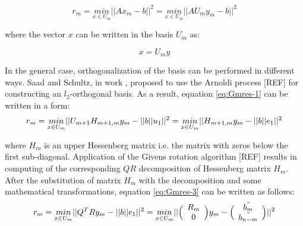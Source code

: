 \begin{equation} \label{eq:Gmres-1}
	r_{m} = \underset{x \in U_m}{min}||Ax_{m} - b||^2 =  \underset{x \in U_m}{min}||AU_m y_{m} - b||^2
\end{equation}

where the vector $x$ can be written in the basis $U_m$ as:

\begin{equation} \label{eq:Gmres-2}
		x = U_{m} y
\end{equation}

In the general case, orthogonalization of the basis can be performed in different ways. Saad and Schultz, in work \cite{sparse-la:gmrese-origin}, proposed to use the Arnoldi process [REF]  for constructing an $l_2$-orthogonal basis. As a result, equation \ref{eq:Gmres-1} can be written in a form:  \\

\begin{equation} \label{eq:Gmres-3}
	r_{m} = \underset{x \in U_m}{min}||U_{m+1}H_{m+1,m} y_{m} - ||b||u_1||^2 = \\
	\underset{x \in U_m}{min}||H_{m+1,m} y_{m} - ||b||e_1||^2 
\end{equation}

where $H_{m}$ is an upper Hessenberg matrix i.e. the matrix with zeros below the first sub-diagonal. Application of the Givens rotation algorithm [REF]  results in computing of the corresponding $QR$ decomposition of Hessenberg matrix $H_{m}$. After the substitution of matrix $H_{m}$ with the decomposition and some mathematical transformations, equation \ref{eq:Gmres-3} can be written as follows:\\

 
\begin{equation} \label{eq:Gmres-4}
	r_{m} = \\
	\underset{x \in U_m}{min}||Q^{T}Ry_{m} - ||b||e_{1}||^2 = \\
	\underset{x \in U_m}{min}||\Big(\begin{array}{c c}R_m \\ 0 \\\end{array}\Big) y_{m} - \Big(\begin{array}{c c} \tilde{b_m} \\ \tilde{b_{n-m}} \\\end{array}\Big)||^2
\end{equation}

